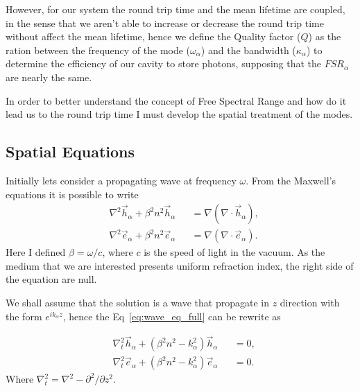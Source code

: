 However, for our system the round trip time and the mean lifetime are coupled, in the sense that we aren't able to increase or decrease the round trip time without affect the mean lifetime, hence we define the Quality factor ($Q$) as the ration between the frequency of the mode ($\omega_\alpha$) and the bandwidth ($\kappa_\alpha$) to determine the efficiency of our cavity to store photons, supposing that the $FSR_\alpha$ are nearly the same. 

In order to better understand the concept of Free Spectral Range and how do it lead us to the round trip time I must develop the spatial treatment of the modes. 
\subsection{Spatial Equations}

Initially lets consider a propagating wave at frequency $\omega$. From the Maxwell's equations it is possible to write
\begin{subequations}
    \begin{alignat}{2}
    &\nabla^2\vec{h}_\alpha+\beta^2n^2\vec{h}_\alpha &&= \nabla(\nabla\cdot\vec{h}_\alpha),\\
    &\nabla^2\vec{e}_\alpha+\beta^2n^2\vec{e}_\alpha &&= \nabla(\nabla\cdot\vec{e}_\alpha).
    \end{alignat}
    \label{eq:wave_eq_full}
\end{subequations}
Here I defined $\beta = \omega/c$, where $c$ is the speed of light in the vacuum. As the medium that we are interested presents uniform refraction index, the right side of the equation are null. 

We shall assume that the solution is a wave that propagate in $z$ direction with the form $e^{ik_\alpha z}$, hence the Eq~\ref{eq:wave_eq_full} can be rewrite as 

\begin{subequations}
    \begin{alignat}{2}
    &\nabla_t^2\vec{h}_\alpha+(\beta^2n^2-k_\alpha^2)\vec{h}_\alpha &&=0,\\
    &\nabla_t^2\vec{e}_\alpha+(\beta^2n^2-k_\alpha^2)\vec{e}_\alpha &&=0.
    \end{alignat}
    \label{eq:wave_eq}
\end{subequations}
Where $\nabla_t^2 = \nabla^2 - \partial^2/\partial z^2$.


